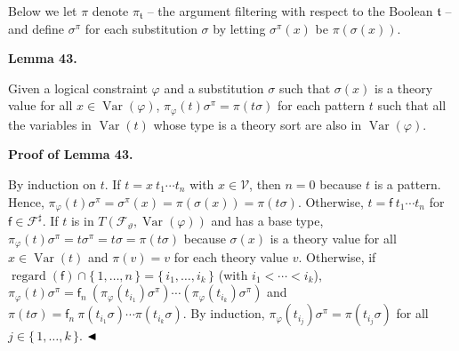 \documentclass[10pt,a4paper]{amsart}
\begin{document}
 
Below we let $\pi$ denote $\pi_{\mathfrak{t}}$ – the argument filtering with respect to the Boolean $\mathfrak{t}$ – and define $\sigma^{\pi}$ for each substitution $\sigma$ by letting $\sigma^{\pi}(x)$ be $\pi(\sigma(x))$.\par
 
 
 
\par\medskip\noindent\textbf{Lemma 43.}\par
 
 
Given a logical constraint $\varphi$ and a substitution $\sigma$ such that $\sigma(x)$ is a theory value for all $x\in\operatorname{Var}(\varphi)$, $\pi_{\varphi}(t)\sigma^{\pi}=\pi(t\sigma)$ for each pattern $t$ such that all the variables in $\operatorname{Var}(t)$ whose type is a theory sort are also in $\operatorname{Var}(\varphi)$.\par
 
 
 
 
 
\par\medskip\noindent\textbf{Proof of Lemma 43.}\par
 
 
By induction on $t$. If $t={x}\ {{t}_{1}\cdots{t}_{n}}$ with $x\in\mathcal{V}$, then $n=0$ because $t$ is a pattern. Hence, $\pi_{\varphi}(t)\sigma^{\pi}=\sigma^{\pi}(x)=\pi(\sigma(x))=\pi(t\sigma)$. Otherwise, $t={\mathsf{f}}\ {{t}_{1}\cdots{t}_{n}}$ for $\mathsf{f}\in\mathcal{F}^{\sharp}$. If $t$ is in $T({\mathcal{F}}_{\vartheta},\operatorname{Var}(\varphi))$ and has a base type, $\pi_{\varphi}(t)\sigma^{\pi}=t\sigma^{\pi}=t\sigma=\pi(t\sigma)$ because $\sigma(x)$ is a theory value for all $x\in\operatorname{Var}(t)$ and $\pi(v)=v$ for each theory value $v$. Otherwise, if $\operatorname{regard}(\mathsf{f})\cap\{\,1,\ldots,n\,\}=\{\,{i}_{1},\ldots,{i}_{k}\,\}$ (with ${i}_{1}<\cdots<{i}_{k}$), $\pi_{\varphi}(t)\sigma^{\pi}={\mathsf{f}_{n}}\ {(\pi_{\varphi}(t_{i_{1}})\sigma^{\pi})\cdots(\pi_{\varphi}(t_{i_{k}})\sigma^{\pi})}$ and $\pi(t\sigma)={\mathsf{f}_{n}}\ {\pi(t_{i_{1}}\sigma)\cdots\pi(t_{i_{k}}\sigma)}$. By induction, $\pi_{\varphi}(t_{i_{j}})\sigma^{\pi}=\pi(t_{i_{j}}\sigma)$ for all $j\in\{\,1,\ldots,k\,\}$. $\hfill\blacktriangleleft$\par
 
\end{document}
